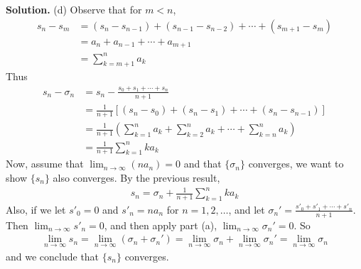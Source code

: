 \documentclass[12pt]{article}
\theoremstyle{definition}
\begin{document}
\smallskip
\noindent\textbf{Solution.}\quad
(d) Observe that for $m<n$,
\begin{align*}
s_n-s_m
&=\left(s_n-s_{n-1}\right)+\left(s_{n-1}-s_{n-2}\right)+\cdots+\left(s_{m+1}-s_m\right) \\
&=a_n+a_{n-1}+\cdots+a_{m+1} \\
&=\sum_{k=m+1}^na_k
\end{align*}
Thus
\begin{align*}
s_n-\sigma_n
&=s_n-\frac{s_0+s_1+\cdots+s_n}{n+1} \\
&=\frac{1}{n+1}\left[\left(s_n-s_0\right)+\left(s_n-s_1\right)+\cdots+\left(s_n-s_{n-1}\right)\right] \\
&=\frac{1}{n+1}\left(\sum_{k=1}^na_k+\sum_{k=2}^na_k+\cdots+\sum_{k=n}^na_k\right) \\
&=\frac{1}{n+1}\sum_{k=1}^nka_k
\end{align*}
Now, assume that $\lim_{n\to\infty}(na_n)=0$ and that $\{\sigma_n\}$ converges, we want to show $\{s_n\}$ also converges. By the previous result,
\begin{align*}
s_n
=\sigma_n+\frac{1}{n+1}\sum_{k=1}^nka_k
\end{align*}
Also, if we let $s'_0=0$ and $s'_n=na_n$ for $n=1,2,\ldots$, and let $\sigma_n'=\frac{s'_0+s'_1+\cdots+s'_n}{n+1}$. Then $\lim_{n\to\infty}s'_n=0$, and then apply part (a), $\lim_{n\to\infty}\sigma_n'=0$. So
\begin{align*}
\lim_{n\to\infty}s_n
=\lim_{n\to\infty}\left(\sigma_n+\sigma_n'\right)
=\lim_{n\to\infty}\sigma_n+\lim_{n\to\infty}\sigma_n'
=\lim_{n\to\infty}\sigma_n
\end{align*}
and we conclude that $\{s_n\}$ converges.
\end{document}
